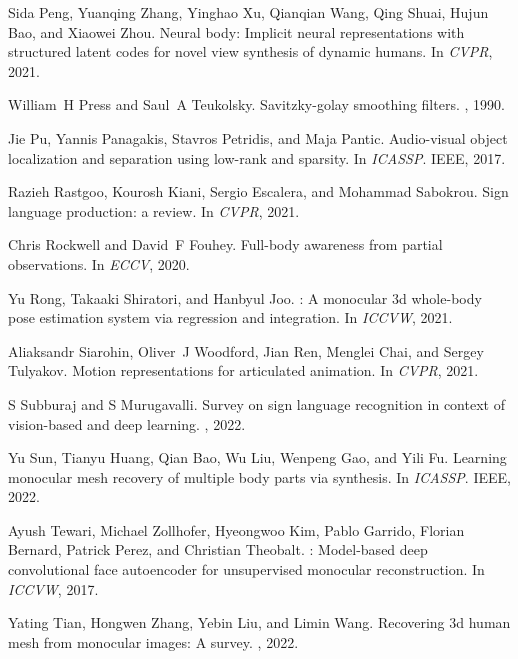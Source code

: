 \documentclass[10pt,twocolumn,letterpaper]{article}
\begin{document}
\begin{thebibliography}{10}
Sida Peng, Yuanqing Zhang, Yinghao Xu, Qianqian Wang, Qing Shuai, Hujun Bao,
  and Xiaowei Zhou.
\newblock Neural body: Implicit neural representations with structured latent
  codes for novel view synthesis of dynamic humans.
\newblock In {\em CVPR}, 2021.

William~H Press and Saul~A Teukolsky.
\newblock Savitzky-golay smoothing filters.
, 1990.

Jie Pu, Yannis Panagakis, Stavros Petridis, and Maja Pantic.
\newblock Audio-visual object localization and separation using low-rank and
  sparsity.
\newblock In {\em ICASSP}. IEEE, 2017.

Razieh Rastgoo, Kourosh Kiani, Sergio Escalera, and Mohammad Sabokrou.
\newblock Sign language production: a review.
\newblock In {\em CVPR}, 2021.

Chris Rockwell and David~F Fouhey.
\newblock Full-body awareness from partial observations.
\newblock In {\em ECCV}, 2020.

Yu Rong, Takaaki Shiratori, and Hanbyul Joo.
: A monocular 3d whole-body pose estimation system via
  regression and integration.
\newblock In {\em ICCVW}, 2021.

Aliaksandr Siarohin, Oliver~J Woodford, Jian Ren, Menglei Chai, and Sergey
  Tulyakov.
\newblock Motion representations for articulated animation.
\newblock In {\em CVPR}, 2021.

S Subburaj and S Murugavalli.
\newblock Survey on sign language recognition in context of vision-based and
  deep learning.
, 2022.

Yu Sun, Tianyu Huang, Qian Bao, Wu Liu, Wenpeng Gao, and Yili Fu.
\newblock Learning monocular mesh recovery of multiple body parts via
  synthesis.
\newblock In {\em ICASSP}. IEEE, 2022.

Ayush Tewari, Michael Zollhofer, Hyeongwoo Kim, Pablo Garrido, Florian Bernard,
  Patrick Perez, and Christian Theobalt.
: Model-based deep convolutional face autoencoder for
  unsupervised monocular reconstruction.
\newblock In {\em ICCVW}, 2017.

Yating Tian, Hongwen Zhang, Yebin Liu, and Limin Wang.
\newblock Recovering 3d human mesh from monocular images: A survey.
, 2022.


\end{thebibliography}
\end{document}
